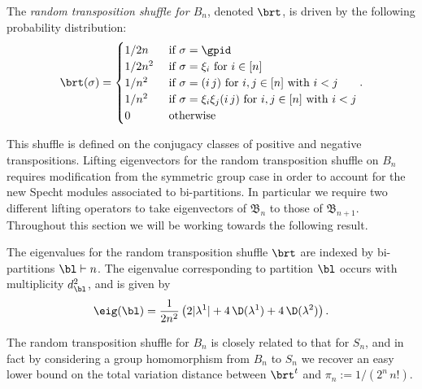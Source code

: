 \documentclass[11pt]{report}
\begin{document}
\begin{defn}
	The \emph{random transposition shuffle for $B_{n}$}, denoted $\brt$,  is driven by the following probability distribution:
	\begin{eqnarray}
	\brt( \sigma ) = \begin{cases}
	1/2n & \textnormal{ if } \sigma = \gpid \\
	1/2n^{2} & \textnormal{ if } \sigma = \xi_{i} \textnormal{ for } i \in [n] \\
	1/n^{2} & \textnormal{ if } \sigma = (i \, j)  \textnormal{ for } i,j \in [n] \textnormal{ with } i<j\\
	1/n^{2} & \textnormal{ if } \sigma = \xi_{i} \xi_{j} (i \, j)  \textnormal{ for } i,j \in [n] \textnormal{ with } i<j \\
	0 & \textnormal{ otherwise }
	\end{cases}.
	\end{eqnarray}
\end{defn}

This shuffle is defined on the conjugacy classes of positive and negative transpositions.
Lifting eigenvectors for the random transposition shuffle on $B_{n}$ requires modification from the symmetric group case in order to account for the new Specht modules associated to bi-partitions. In particular we require two different lifting operators to take eigenvectors of $\mathfrak{B}_{n}$ to those of $\mathfrak{B}_{n+1}$. Throughout this section we will be working towards the following result.




\begin{thm}
	\label{chpt6:thm:rteig}
	The eigenvalues for the random transposition shuffle $\brt$ are indexed by bi-partitions
	$\bl \vdash n$. The eigenvalue corresponding to partition $\bl$ occurs with multiplicity $d_{\bl}^{2}$, and is given by
	\begin{eqnarray}
	\eig(\bl) = \frac{1}{2n^{2}}\left(2|\lambda^{1}| + 
	4 \, \D(\lambda^{1}) + 
	4 \, \D(\lambda^{2})\right). \label{chpt6:eqn:rteig}
	\end{eqnarray}
	
	
	
\end{thm}

The random transposition shuffle for $B_{n}$ is closely related to that for $S_{n}$, and in fact by considering a group homomorphism from $B_{n}$ to $S_{n}$ we recover an easy lower bound on the total variation distance between $\brt^{t}$ and $\pi_{n} := 1/ (2^{n} \, n!)$. 
\end{document}
